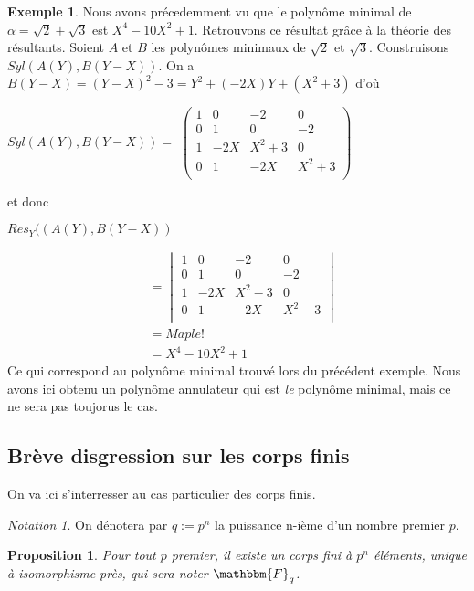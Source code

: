 \documentclass[12pt]{article}
\newcommand{\Fq}{\mathbbm{F}_q}
\newtheorem{prop}{Proposition}
\theoremstyle{definition}\newtheorem{defn}{Définition}
\theoremstyle{definition}\newtheorem{exm}{Exemple}
\theoremstyle{definition}\newtheorem{rem}{Remarque}
\theoremstyle{definition}\newtheorem{algo}{Algorithme}
\theoremstyle{remark}\newtheorem{exo}{Exercice}
\theoremstyle{remark}\newtheorem{nota}{Notation}
\begin{document}
\begin{exm}
Nous avons précedemment vu que le polynôme minimal de $\alpha = \sqrt2 + \sqrt3$ est $X^4 -10X^2 +1$. Retrouvons ce résultat grâce à la théorie des résultants. Soient $A$ et $B$ les polynômes minimaux de $\sqrt2$ et $\sqrt3$. Construisons $Syl(A(Y), B(Y-X))$. On a $B(Y-X) = (Y-X)^2 -3 = Y^2 + (-2X)Y + (X^2+3)$ d'où

\begin{center}
$Syl(A(Y), B(Y-X)) =$
$
   \begin{pmatrix} 
1 & 0 & -2 & 0 \\
0 & 1 & 0 & -2 \\
1 & -2X & X^2 +3 & 0 \\
0 & 1 & -2X & X^2 +3 \\
   \end{pmatrix} 
$
\end{center}

et donc

			\begin{center} $Res_Y((A(Y), B(Y-X))$ \end{center}
			\begin{align*} 
&= \begin{vmatrix} 1 & 0 & -2 & 0 \\ 0 & 1 & 0 & -2 \\ 1 & -2X & X^2 - 3 & 0 \\ 0 & 1 & -2X & X^2 -3 \\\end{vmatrix}  \\
&= Maple ! \\
&= X^4 -10X^2 +1 
			\end{align*} 
Ce qui correspond au polynôme minimal trouvé lors du précédent exemple. Nous avons ici obtenu un polynôme annulateur qui est \textit{le} polynôme minimal, mais ce ne sera pas toujorus le cas.
\end{exm}

\subsection{Brève disgression sur les corps finis}

On va ici s'interresser au cas particulier des corps finis.

\begin{nota}
On dénotera par $q := p^n$ la puissance n-ième d'un nombre premier $p$.
\end{nota}

\begin{prop}
Pour tout $p$ premier, il existe un corps fini à $p^n$ éléments, unique à isomorphisme près, qui sera noter $\Fq$.
\end{prop}
\end{document}
